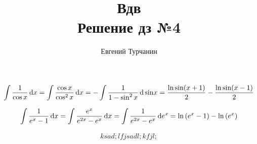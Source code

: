 \documentclass{report}
\title{\Huge{Вдв}\\ Решение дз №4}
\author{\huge{Евгений Турчанин}}
\date{}
\begin{document}
\maketitle

\sol
\begin{align*}
\displaystyle \int \dfrac{1}{\cos x} \dl x=\int \dfrac{\cos x}{\cos^2 x} \dl x
=-\int \dfrac{1}{1-\sin^2 x} \dl \sin x=\dfrac{\ln{\sin (x+1)}}{2}-\dfrac{\ln{\sin (x-1)}}{2}
\end{align*}

\sol
\begin{align*}
	\displaystyle \int \dfrac{1}{e^x-1} \dl x=\int \dfrac{e^x}{e^{2x}-e^x} \dl x=
	\int \dfrac{1}{e^{2x}-e^x} \dl e^x=\ln{(e^x-1)}-\ln{(e^x)}
\end{align*}

\begin{align*}
	ksad;lfjsadl;k fjl;
\end{align*}




\end{document}
